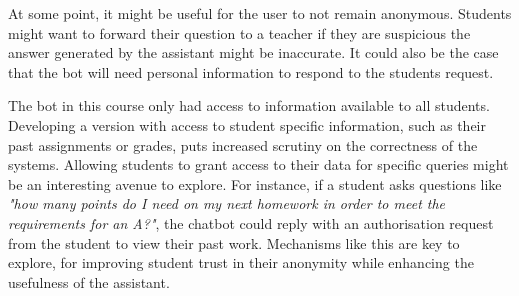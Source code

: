 At some point, it might be useful for the user to not remain anonymous. Students might want to forward their question to a teacher if they are suspicious the answer generated by the assistant might be inaccurate. It could also be the case that the bot will need personal information to respond to the students request.


The bot in this course only had access to information available to all students. Developing a version with access to student specific information, such as their past assignments or grades, puts increased scrutiny on the correctness of the systems. Allowing students to grant access to their data for specific queries might be an interesting avenue to explore. For instance, if a student asks questions like \textit{"how many points do I need on my next homework in order to meet the requirements for an A?"}, the chatbot could reply with an authorisation request from the student to view their past work. Mechanisms like this are key to explore, for improving student trust in their anonymity while enhancing the usefulness of the assistant.






%






\cleardoublepage